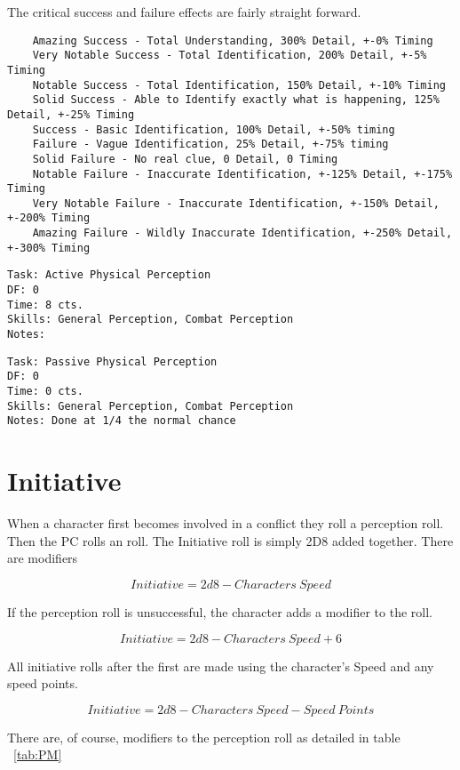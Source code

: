 The critical success and failure effects are fairly straight forward. 

\begin{verbatim}
	Amazing Success - Total Understanding, 300% Detail, +-0% Timing
	Very Notable Success - Total Identification, 200% Detail, +-5% Timing
    Notable Success - Total Identification, 150% Detail, +-10% Timing
	Solid Success - Able to Identify exactly what is happening, 125% Detail, +-25% Timing
	Success - Basic Identification, 100% Detail, +-50% timing
	Failure - Vague Identification, 25% Detail, +-75% timing
	Solid Failure - No real clue, 0 Detail, 0 Timing
	Notable Failure - Inaccurate Identification, +-125% Detail, +-175% Timing
	Very Notable Failure - Inaccurate Identification, +-150% Detail, +-200% Timing
	Amazing Failure - Wildly Inaccurate Identification, +-250% Detail, +-300% Timing
\end{verbatim}

\begin{verbatim}
Task: Active Physical Perception  
DF: 0 
Time: 8 cts. 
Skills: General Perception, Combat Perception
Notes: 
\end{verbatim}

\begin{verbatim}
Task: Passive Physical Perception  
DF: 0 
Time: 0 cts. 
Skills: General Perception, Combat Perception
Notes: Done at 1/4 the normal chance 
\end{verbatim}



\section{Initiative}

When a character first becomes involved in a conflict they
roll a perception roll. Then the PC rolls an  roll. The 
Initiative roll is simply 2D8 added together. There are modifiers 

\[{Initiative} = 2d8 - {Characters\ Speed}\]

If the perception roll is unsuccessful, the character adds a modifier 
to the roll. 

\[{Initiative} = 2d8 - {Characters\ Speed} + 6\]

All initiative rolls after the first are made using the character's 
Speed and any speed points.

\[{Initiative} = 2d8 - {Characters\ Speed} - {Speed\ Points}\]

There are, of course, modifiers to the perception roll as detailed in table 
~\ref{tab:PM}


